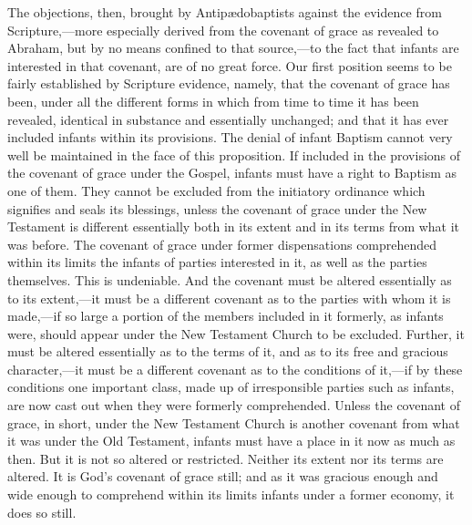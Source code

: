 \documentclass[]{book}
\begin{document}
The objections, then, brought by Antipædobaptists against the evidence from Scripture,---more especially derived from the covenant of grace as revealed to Abraham, but by no means confined to that source,---to the fact that infants are interested in that covenant, are of no great force. Our first position seems to be fairly established by Scripture evidence, namely, that the covenant of grace has been, under all the different forms in which from time to time it has been revealed, identical in substance and essentially unchanged; and that it has ever included infants within its provisions. The denial of infant Baptism cannot very well be maintained in the face of this proposition. If included in the provisions of the covenant of grace under the Gospel, infants must have a right to Baptism as one of them. They cannot be excluded from the initiatory ordinance which signifies and seals its blessings, unless the covenant of grace under the New Testament is different essentially both in its extent and in its terms from what it was before. The covenant of grace under former dispensations comprehended within its limits the infants of parties interested in it, as well as the parties themselves. This is undeniable. And the covenant must be altered essentially as to its extent,---it must be a different covenant as to the parties with whom it is made,---if so large a portion of the members included in it formerly, as infants were, should appear under the New Testament Church to be excluded. Further, it must be altered essentially as to the terms of it, and as to its free and gracious character,---it must be a different covenant as to the conditions of it,---if by these conditions one important class, made up of irresponsible parties such as infants, are now cast out when they were formerly comprehended. Unless the covenant of grace, in short, under the New Testament Church is another covenant from what it was under the Old Testament, infants must have a place in it now as much as then. But it is not so altered or restricted. Neither its extent nor its terms are altered. It is God's covenant of grace still; and as it was gracious enough and wide enough to comprehend within its limits infants under a former economy, it does so still.
\end{document}
